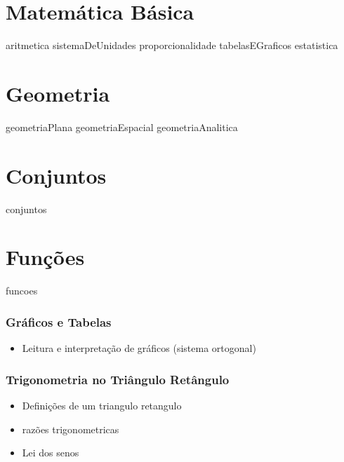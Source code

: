 \documentclass[11pt,fleqn]{book}
\begin{document}
\part{Matemática Básica}
{aritmetica}
{sistemaDeUnidades}
{proporcionalidade}
{tabelasEGraficos}
{estatistica}

\part{Geometria}
{geometriaPlana}
{geometriaEspacial}
{geometriaAnalitica}

\part{Conjuntos}
{conjuntos}

\part{Funções}
{funcoes}


\section{Gráficos e Tabelas}%
\begin{itemize}
	\item Leitura e interpretação de gráficos (sistema ortogonal)
\end{itemize}

\section{Trigonometria no Triângulo Retângulo}

	\begin{itemize}
		\item   Definições de um triangulo retangulo
		\item razões trigonometricas
		\item Lei dos senos
	\end{itemize}
	
\end{document}
